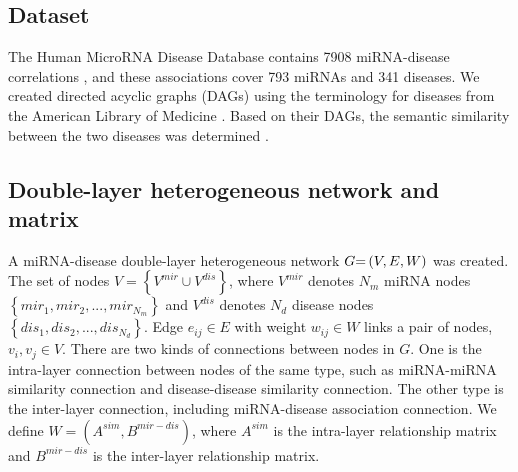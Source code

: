 \documentclass[journal,twoside,web]{ieeecolor}
\begin{document}
\subsection{Dataset}

The Human MicroRNA Disease Database contains 7908 miRNA-disease correlations \cite{35}, and these associations cover 793 miRNAs and 341 diseases. We created directed acyclic graphs (DAGs) using the terminology for diseases from the American Library of Medicine \cite{0Meshable}. Based on their DAGs, the semantic similarity between the two diseases was determined \cite{2010Inferring}.

\subsection{Double-layer heterogeneous network and matrix}

A miRNA-disease double-layer heterogeneous network $G{\rm{ = }}\left( {V,E,W} \right)$ was created. The set of nodes $V = \left\{ {{V^{mir}} \cup {V^{dis}}} \right\}$, where ${V^{mir}}$ denotes ${N_m}$ miRNA nodes $\left\{ {mi{r_1},mi{r_2},...,mi{r_{{N_m}}}} \right\}$ and ${V^{dis}}$ denotes ${N_d}$ disease nodes $\left\{ {di{s_1},di{s_2},...,di{s_{{N_d}}}} \right\}$.
Edge ${e_{ij}} \in E$ with weight ${w_{ij}} \in W$ links a pair of nodes, ${v_i},{v_j} \in V$. There are two kinds of connections between nodes in $G$. One is the intra-layer connection between nodes of the same type, such as miRNA-miRNA similarity connection and disease-disease similarity connection. The other type is the inter-layer connection, including miRNA-disease association connection. We define $W = \left( {{A^{sim}},{B^{mir - dis}}} \right)$, where ${A^{sim}}$ is the intra-layer relationship matrix and ${B^{mir - dis}}$ is the inter-layer relationship matrix.
\end{document}
